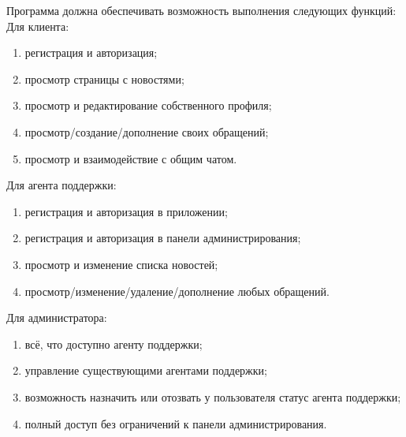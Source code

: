 Программа должна обеспечивать возможность выполнения следующих функций:\\

Для клиента:
\begin{enumerate}[noitemsep]
    \item регистрация и авторизация;
    \item просмотр страницы с новостями;
    \item просмотр и редактирование собственного профиля;
    \item просмотр/создание/дополнение своих обращений;
    \item просмотр и взаимодействие с общим чатом.
\end{enumerate}

Для агента поддержки:
\begin{enumerate}[noitemsep]
    \item регистрация и авторизация в приложении;
    \item регистрация и авторизация в панели администрирования;
    \item просмотр и изменение списка новостей;
    \item просмотр/изменение/удаление/дополнение любых обращений.
\end{enumerate}

Для администратора:
\begin{enumerate}[noitemsep]
    \item всё, что доступно агенту поддержки;
    \item управление существующими агентами поддержки;
    \item возможность назначить или отозвать у пользователя статус агента поддержки;
    \item полный доступ без ограничений к панели администрирования.
\end{enumerate}